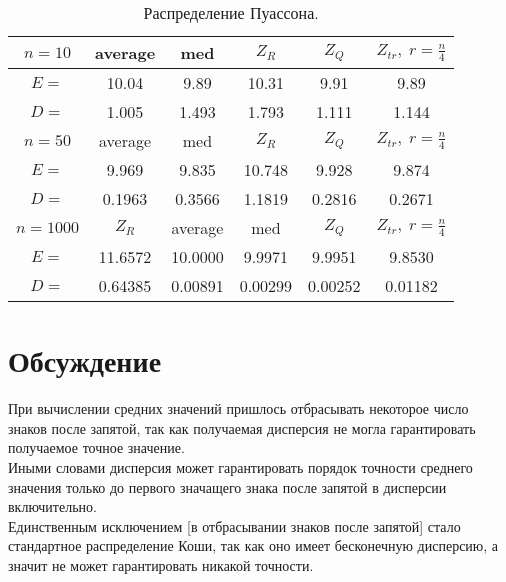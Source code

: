 \documentclass[a4]{article}
\begin{document}
		\begin{table}[h]
			\caption{ Распределение Пуассона.}
			\begin{center}
				\begin{tabular}{|c|c|c|c|c|c|}
					\hline
					$n = 10$   & average & med & $Z_R$ & $Z_Q$ & $Z_{tr},\;r=\frac{n}{4}$\\ \hline
					$E =$     & 10.04     &   9.89        & 10.31     &   9.91      &   9.89 \\ \hline
					$D =$     &  	1.005   &      1.493  &       1.793      &   1.111      &   1.144\\ \hline
					
					$n = 50$   & average & med & $Z_R$ & $Z_Q$ & $Z_{tr},\;r=\frac{n}{4}$\\ \hline
					$E =$      & 	9.969     &    9.835  &       10.748     &   9.928     &    9.874    \\ \hline
					$D =$       &	0.1963     &   0.3566   &      1.1819      &   0.2816      &   0.2671  \\ \hline
					
					$n = 1000$  & $Z_R$ & average & med  & $Z_Q$ & $Z_{tr},\;r=\frac{n}{4}$\\ \hline
					$E =$    &    11.6572  & 10.0000  &      9.9971         &    9.9951  &       9.8530\\ \hline
					$D =$    &       0.64385  & 	0.00891   &      0.00299        &   0.00252      &   0.01182  \\
					\hline
				\end{tabular}
			\end{center}
		\end{table}
		\newpage
			
	\section{Обсуждение}
		\par При вычислении средних значений пришлось отбрасывать некоторое число знаков после запятой, так как получаемая дисперсия не могла гарантировать получаемое точное значение. \\
		Иными словами дисперсия может гарантировать порядок точности среднего значения только до первого значащего знака после запятой в дисперсии включительно.\\ Единственным исключением [в отбрасывании знаков после запятой] стало стандартное распределение Коши, так как оно имеет бесконечную дисперсию, а значит не может гарантировать никакой точности.
		
\end{document}
